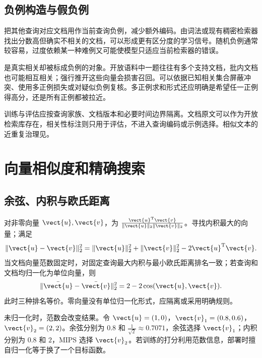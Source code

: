 \documentclass[../textbook.tex]{subfiles}
\begin{document}
\subsection{负例构造与假负例}
把其他查询对应文档用作当前查询负例，减少额外编码。由词法或现有稠密检索器找出分数高但确实不相关的文档，可以形成更有区分度的学习信号。随机负例通常较容易，过度依赖某一种难例又可能使模型只适应当前检索器的错误。

是真实相关却被标成负例的对象。开放语料中一题往往有多个支持文档，批内文档也可能相互相关；强行推开这些向量会损害召回。可以依据已知相关集合屏蔽冲突、使用多正例损失或对疑似负例复核。多正例求和形式还应明确是希望任一正例得高分，还是所有正例都被拉近。

训练与评估应按查询家族、文档版本和必要时间边界隔离。文档原文可以作为开放检索库存在，相关性标注则只用于评估，不进入查询编码或示例选择。相似文本的近重复治理见。

\section{向量相似度和精确搜索}

\subsection{余弦、内积与欧氏距离}
对非零向量 $\vect{u},\vect{v}$，为 $\frac{\vect{u}^{\mathrm{T}}\vect{v}}{\|\vect{u}\|_2\|\vect{v}\|_2}$。寻找内积最大的向量；满足
\begin{equation}
\|\vect{u}-\vect{v}\|_2^2=\|\vect{u}\|_2^2+\|\vect{v}\|_2^2-2\vect{u}^{\mathrm{T}}\vect{v}.
\end{equation}
当文档向量范数固定时，对固定查询最大内积与最小欧氏距离排名一致；若查询和文档均归一化为单位向量，则
\begin{equation}
\|\bar{\vect{u}}-\bar{\vect{v}}\|_2^2=2-2\cos(\vect{u},\vect{v}).
\label{eq:ir-metric}
\end{equation}
此时三种排名等价。零向量没有单位归一化形式，应隔离或采用明确规则。

未归一化时，范数会改变结果。令 $\vect{u}=(1,0)$，$\vect{v}_1=(0.8,0.6)$，$\vect{v}_2=(2,2)$。余弦分别为 $0.8$ 和 $\frac{1}{\sqrt2}\approx0.7071$，余弦选择 $\vect{v}_1$；内积分别为 $0.8$ 和 $2$，MIPS 选择 $\vect{v}_2$。若训练的打分利用范数信息，部署时擅自归一化等于换了一个目标函数。
\end{document}
